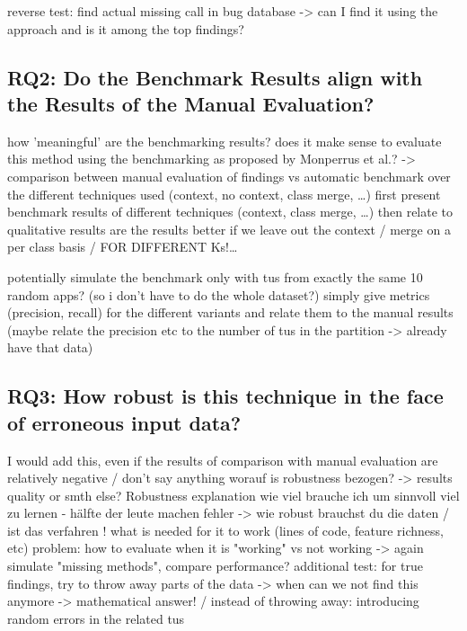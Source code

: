reverse test: find actual missing call in bug database -> can I find it using the approach and is it among the top findings?

\subsection{RQ2: Do the Benchmark Results align with the Results of the Manual Evaluation?}

how 'meaningful' are the benchmarking results?
does it make sense to evaluate this method using the benchmarking as proposed by Monperrus et al.?
-> comparison between manual evaluation of findings vs automatic benchmark over the different techniques used (context, no context, class merge, \ldots)
first present benchmark results of different techniques (context, class merge, \ldots) then relate to qualitative results
are the results better if we leave out the context / merge on a per class basis / FOR DIFFERENT Ks!\ldots


potentially simulate the benchmark only with tus from exactly the same 10 random apps? (so i don't have to do the whole dataset?)
simply give metrics (precision, recall) for the different variants and relate them to the manual results
(maybe relate the precision etc to the number of tus in the partition -> already have that data)

\subsection{RQ3: How robust is this technique in the face of erroneous input data?}

I would add this, even if the results of comparison with manual evaluation are relatively negative / don't say anything
worauf is robustness bezogen? -> results quality or smth else?
Robustness explanation
    wie viel brauche ich um sinnvoll viel zu lernen - hälfte der leute machen fehler -> wie robust brauchst du die daten / ist das verfahren !
    what is needed for it to work (lines of code, feature richness, etc) 
    problem: how to evaluate when it is "working" vs not working -> again simulate "missing methods", compare performance?
additional test:
	for true findings, try to throw away parts of the data -> when can we not find this anymore -> mathematical answer!
    / instead of throwing away: introducing random errors in the related tus


